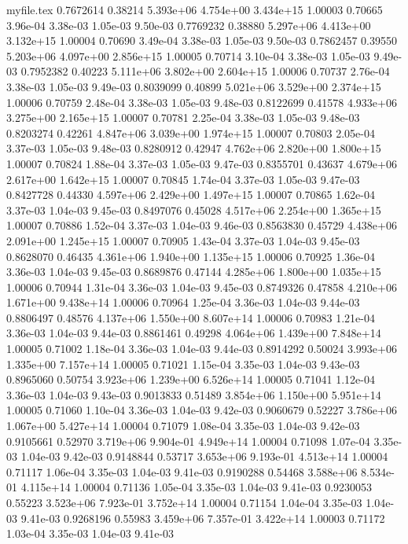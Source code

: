 \begin{filecontents}{myfile.tex}
0.7672614 0.38214 5.393e+06 4.754e+00 3.434e+15 1.00003 0.70665 3.96e-04 3.38e-03 1.05e-03 9.50e-03
0.7769232 0.38880 5.297e+06 4.413e+00 3.132e+15 1.00004 0.70690 3.49e-04 3.38e-03 1.05e-03 9.50e-03
0.7862457 0.39550 5.203e+06 4.097e+00 2.856e+15 1.00005 0.70714 3.10e-04 3.38e-03 1.05e-03 9.49e-03
0.7952382 0.40223 5.111e+06 3.802e+00 2.604e+15 1.00006 0.70737 2.76e-04 3.38e-03 1.05e-03 9.49e-03
0.8039099 0.40899 5.021e+06 3.529e+00 2.374e+15 1.00006 0.70759 2.48e-04 3.38e-03 1.05e-03 9.48e-03
0.8122699 0.41578 4.933e+06 3.275e+00 2.165e+15 1.00007 0.70781 2.25e-04 3.38e-03 1.05e-03 9.48e-03
0.8203274 0.42261 4.847e+06 3.039e+00 1.974e+15 1.00007 0.70803 2.05e-04 3.37e-03 1.05e-03 9.48e-03
0.8280912 0.42947 4.762e+06 2.820e+00 1.800e+15 1.00007 0.70824 1.88e-04 3.37e-03 1.05e-03 9.47e-03
0.8355701 0.43637 4.679e+06 2.617e+00 1.642e+15 1.00007 0.70845 1.74e-04 3.37e-03 1.05e-03 9.47e-03
0.8427728 0.44330 4.597e+06 2.429e+00 1.497e+15 1.00007 0.70865 1.62e-04 3.37e-03 1.04e-03 9.45e-03
0.8497076 0.45028 4.517e+06 2.254e+00 1.365e+15 1.00007 0.70886 1.52e-04 3.37e-03 1.04e-03 9.46e-03
0.8563830 0.45729 4.438e+06 2.091e+00 1.245e+15 1.00007 0.70905 1.43e-04 3.37e-03 1.04e-03 9.45e-03
0.8628070 0.46435 4.361e+06 1.940e+00 1.135e+15 1.00006 0.70925 1.36e-04 3.36e-03 1.04e-03 9.45e-03
0.8689876 0.47144 4.285e+06 1.800e+00 1.035e+15 1.00006 0.70944 1.31e-04 3.36e-03 1.04e-03 9.45e-03
0.8749326 0.47858 4.210e+06 1.671e+00 9.438e+14 1.00006 0.70964 1.25e-04 3.36e-03 1.04e-03 9.44e-03
0.8806497 0.48576 4.137e+06 1.550e+00 8.607e+14 1.00006 0.70983 1.21e-04 3.36e-03 1.04e-03 9.44e-03
0.8861461 0.49298 4.064e+06 1.439e+00 7.848e+14 1.00005 0.71002 1.18e-04 3.36e-03 1.04e-03 9.44e-03
0.8914292 0.50024 3.993e+06 1.335e+00 7.157e+14 1.00005 0.71021 1.15e-04 3.35e-03 1.04e-03 9.43e-03
0.8965060 0.50754 3.923e+06 1.239e+00 6.526e+14 1.00005 0.71041 1.12e-04 3.36e-03 1.04e-03 9.43e-03
0.9013833 0.51489 3.854e+06 1.150e+00 5.951e+14 1.00005 0.71060 1.10e-04 3.36e-03 1.04e-03 9.42e-03
0.9060679 0.52227 3.786e+06 1.067e+00 5.427e+14 1.00004 0.71079 1.08e-04 3.35e-03 1.04e-03 9.42e-03
0.9105661 0.52970 3.719e+06 9.904e-01 4.949e+14 1.00004 0.71098 1.07e-04 3.35e-03 1.04e-03 9.42e-03
0.9148844 0.53717 3.653e+06 9.193e-01 4.513e+14 1.00004 0.71117 1.06e-04 3.35e-03 1.04e-03 9.41e-03
0.9190288 0.54468 3.588e+06 8.534e-01 4.115e+14 1.00004 0.71136 1.05e-04 3.35e-03 1.04e-03 9.41e-03
0.9230053 0.55223 3.523e+06 7.923e-01 3.752e+14 1.00004 0.71154 1.04e-04 3.35e-03 1.04e-03 9.41e-03
0.9268196 0.55983 3.459e+06 7.357e-01 3.422e+14 1.00003 0.71172 1.03e-04 3.35e-03 1.04e-03 9.41e-03

\end{filecontents}

